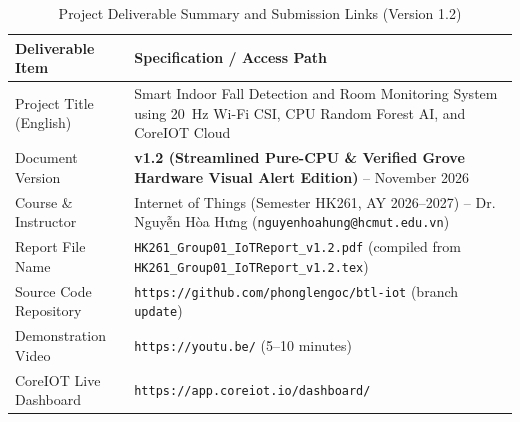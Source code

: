 \documentclass{hcmut-report}
\begin{document}
\begin{table}[H]
\centering
\caption{Project Deliverable Summary and Submission Links (Version 1.2)}
\label{tab:submission_info}
\small
\begin{tabularx}{\textwidth}{|P{4.2cm}|Y|}
\hline
\textbf{Deliverable Item} & \textbf{Specification / Access Path} \\
\hline
Project Title (English) & Smart Indoor Fall Detection and Room Monitoring System using 20~Hz Wi-Fi CSI, CPU Random Forest AI, and CoreIOT Cloud \\
\hline
Document Version & \textbf{v1.2 (Streamlined Pure-CPU \& Verified Grove Hardware Visual Alert Edition)} -- November 2026 \\
\hline
Course \& Instructor & Internet of Things (Semester HK261, AY 2026--2027) -- Dr. Nguyễn Hòa Hưng (\texttt{nguyenhoahung@hcmut.edu.vn}) \\
\hline
Report File Name & \texttt{HK261\_Group01\_IoTReport\_v1.2.pdf} (compiled from \texttt{HK261\_Group01\_IoTReport\_v1.2.tex}) \\
\hline
Source Code Repository & \texttt{https://github.com/\allowbreak phonglengoc/\allowbreak btl-iot} (branch \texttt{update}) \\
\hline
Demonstration Video & \texttt{https://youtu.be/} (5--10 minutes) \\
\hline
CoreIOT Live Dashboard & \texttt{https://app.coreiot.io/\allowbreak dashboard/} \\
\hline
\end{tabularx}
\end{table}
\end{document}

